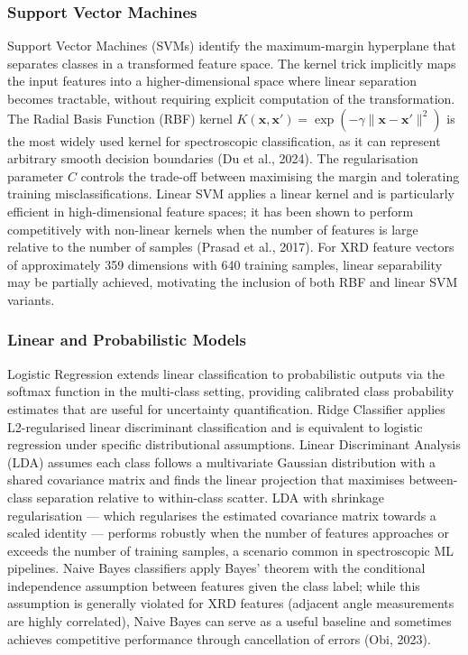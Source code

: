 \documentclass[12pt, oneside]{article} %
\begin{document}
\subsubsection{Support Vector Machines}

Support Vector Machines (SVMs) identify the maximum-margin hyperplane that separates classes in a transformed feature space. The kernel trick implicitly maps the input features into a higher-dimensional space where linear separation becomes tractable, without requiring explicit computation of the transformation. The Radial Basis Function (RBF) kernel $K(\mathbf{x}, \mathbf{x}') = \exp(-\gamma \|\mathbf{x} - \mathbf{x}'\|^2)$ is the most widely used kernel for spectroscopic classification, as it can represent arbitrary smooth decision boundaries (Du et al., 2024). The regularisation parameter $C$ controls the trade-off between maximising the margin and tolerating training misclassifications. Linear SVM applies a linear kernel and is particularly efficient in high-dimensional feature spaces; it has been shown to perform competitively with non-linear kernels when the number of features is large relative to the number of samples (Prasad et al., 2017). For XRD feature vectors of approximately 359 dimensions with 640 training samples, linear separability may be partially achieved, motivating the inclusion of both RBF and linear SVM variants.


\subsubsection{Linear and Probabilistic Models}

Logistic Regression extends linear classification to probabilistic outputs via the softmax function in the multi-class setting, providing calibrated class probability estimates that are useful for uncertainty quantification. Ridge Classifier applies L2-regularised linear discriminant classification and is equivalent to logistic regression under specific distributional assumptions. Linear Discriminant Analysis (LDA) assumes each class follows a multivariate Gaussian distribution with a shared covariance matrix and finds the linear projection that maximises between-class separation relative to within-class scatter. LDA with shrinkage regularisation --- which regularises the estimated covariance matrix towards a scaled identity --- performs robustly when the number of features approaches or exceeds the number of training samples, a scenario common in spectroscopic ML pipelines. Naive Bayes classifiers apply Bayes' theorem with the conditional independence assumption between features given the class label; while this assumption is generally violated for XRD features (adjacent angle measurements are highly correlated), Naive Bayes can serve as a useful baseline and sometimes achieves competitive performance through cancellation of errors (Obi, 2023).
\end{document}
